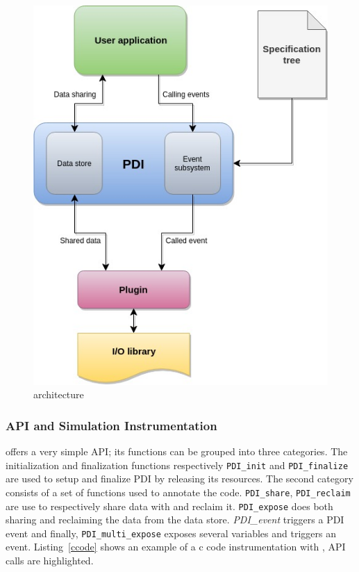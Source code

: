 \begin{figure}[tb]\centering
\includegraphics[scale=0.5]{figures/PDI_schema.jpg}
\caption{\pdi architecture\cite{PDI}}
\label{figpdiarchi}
\end{figure}

\subsubsection{\pdi API and Simulation Instrumentation}
\pdi offers a very simple API; its functions can be grouped into three categories. The initialization and finalization functions respectively \texttt{PDI\_init} and \texttt{PDI\_finalize} are used to setup and finalize PDI by releasing its resources. 
The second category consists of a set of functions used to annotate the code. \texttt{PDI\_share}, \texttt{PDI\_reclaim} are use to respectively share data with \pdi and reclaim it. \texttt{PDI\_expose} does both sharing and reclaiming the data from the data store. \textit{PDI\_event} triggers a PDI event and finally, \texttt{PDI\_multi\_expose} exposes several variables and triggers an event. Listing~\ref{ccode} shows an example of a c code instrumentation with \pdi, \pdi API calls are highlighted.

